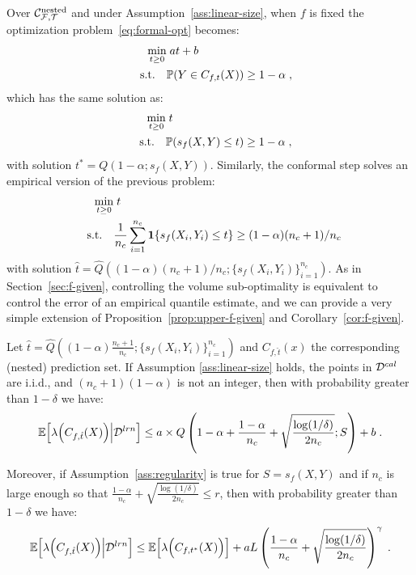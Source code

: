 Over ${\cal C}^{\text{nested}}_{\mathcal{F},{\cal T}}$ and under Assumption~\ref{ass:linear-size}, when $f$ is fixed the optimization problem~\eqref{eq:formal-opt} becomes:
\begin{align*}
    \min_{t \geq 0} &\; at+b \\
     \quad \text{s.t.} \quad & {\mathbb{P}}(Y\in C_{f,t}(X)) \geq 1-\alpha\;, \nonumber
\end{align*}
which has the same solution as:
\begin{align*}
    \min_{t \geq 0} &\; t \label{eq:obj-nested} \\
     \quad \text{s.t.} \quad & {\mathbb{P}}(s_f(X,Y)\leq t) \geq 1-\alpha\;, \nonumber
\end{align*}
with solution $t^*=Q(1-\alpha; s_f(X,Y))$. Similarly, the conformal step solves an empirical version of the previous problem:
\begin{align*}
    \min_{t \geq 0} &\; t  \\
     \quad \text{s.t.} \quad & \frac{1}{n_c}\sum_{i=1}^{n_c}\mathbf{1}\{s_f(X_i,Y_i)\leq t\} \geq (1-\alpha)(n_c+1)/n_c\; \nonumber
\end{align*}
with solution $\hat{t} = \widehat{Q}((1-\alpha)(n_c+1)/n_c;\{s_f(X_i,Y_i)\}_{i=1}^{n_c})$. As in Section~\ref{sec:f-given}, controlling the volume sub-optimality is equivalent to control the error of an empirical quantile estimate, and we can provide a very simple extension of Proposition~\ref{prop:upper-f-given} and Corollary~\ref{cor:f-given}.

\begin{proposition}
    Let $\hat{t} = \widehat{Q}((1-\alpha)\frac{n_c+1}{n_c};\{s_f(X_i,Y_i)\}_{i=1}^{n_c})$ and $C_{f,\hat{t}}(x)$ the corresponding (nested) prediction set. If Assumption \ref{ass:linear-size} holds, the points in ${\cal D}^{cal}$ are i.i.d., and $(n_c+1)(1-\alpha)$ is not an integer, then with probability greater than $1-\delta$ we have:
    \begin{equation*}
        \mathbb{E}\Big[\lambda\Big(C_{f,\hat{t}}(X)\Big) \Big| {\cal D}^{lrn}\Big] \leq a\times Q\left(1-\alpha + \frac{1-\alpha}{n_c} + \sqrt{\frac{\log(1/\delta)}{2n_c}}; S\right) + b\;.
    \end{equation*}

    Moreover, if Assumption~\ref{ass:regularity} is true for $S=s_f(X,Y)$ and if $n_c$ is large enough so that $\frac{1-\alpha}{n_c} + \sqrt{\frac{\log(1/\delta)}{2n_c}} \leq r$, then with probability greater than $1-\delta$ we have:
    \begin{equation*}
        \mathbb{E}\Big[\lambda\Big(C_{f,\hat{t}}(X)\Big)\Big| {\cal D}^{lrn}\Big] \leq \mathbb{E}\Big[\lambda\Big(C_{f,t^*}(X)\Big)\Big] + a L\left(\frac{1-\alpha}{n_c} + \sqrt{\frac{\log(1/\delta)}{2n_c}}\right)^\gamma\;.
    \end{equation*} 
\end{proposition}

